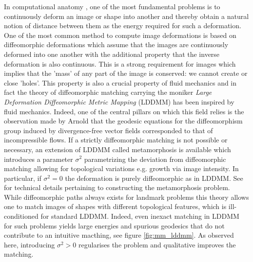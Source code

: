 \documentclass[runningheads]{llncs}
\begin{document}
In computational anatomy
\cite{grenander1994representations,grenander1998computational}, one of the most
fundamental problems is to continuously deform an image or shape into another
and thereby obtain a natural notion of distance between them as the energy
required for such a deformation. One of the most common method to compute image
deformations is based on diffeomorphic deformations which assume that the images
are continuously deformed into one another with the additional property that the
inverse deformation is also continuous.  This is a strong requirement for images
which implies that the 'mass' of any part of the image is conserved: we cannot
create or close 'holes'.  This property is also a crucial property of fluid
mechanics and in fact the theory of diffeomorphic matching carrying the moniker
\emph{Large Deformation Diffeomorphic Metric Mapping}
\cite{trouve1998diffeomorphisms,beg2005computing} (LDDMM) has been inspired by
fluid mechanics. Indeed, one of the central pillars on which this field relies
is the observation made by Arnold \cite{arnold1966geometrie} that the geodesic
equations for the diffeomorphism group induced by divergence-free vector fields
corresponded to that of incompressible flows. If a strictly diffeomorphic
matching is not possible or necessary, an extension of LDDMM called
metamorphosis \cite{trouve2005metamorphoses,holm2009euler} is available which
introduces a parameter $\sigma^2$ parametrizing the deviation from diffeomorphic
matching allowing for topological variations e.g. growth via image intensity. In
particular, if $\sigma^2=0$ the deformation is purely diffeomorphic as in LDDMM.
See \cite{trouve1995infinite,trouve2005local,miller2001group} for technical
details pertaining to constructing the metamorphosis problem. While
diffeomorphic paths always exists for landmark problems
\cite{guo2006diffeomorphic} this theory allows one to match images of shapes
with different topological features, which is ill-conditioned for standard
LDDMM. Indeed, even inexact matching in LDDMM for such problems yields large
energies and spurious geodesics that do not contribute to an intuitive macthing,
see figure \ref{fig:mm_lddmm}. As observed here, introducing $\sigma^2>0$
regularises the problem and qualitative improves the matching.\\
\end{document}
